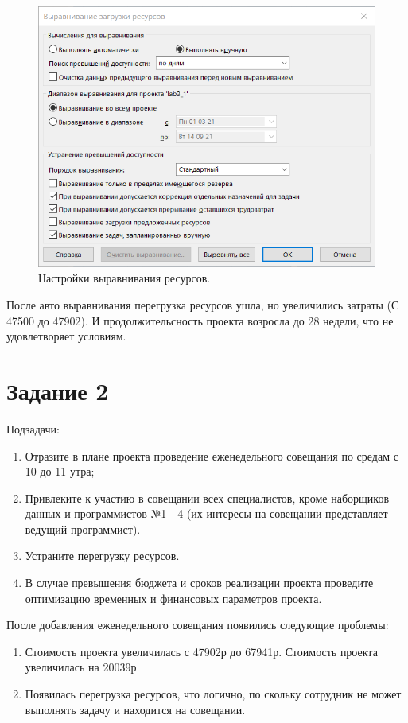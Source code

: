 \begin{figure}[H]
	\centering
	\includegraphics[width=0.7\linewidth]{../../lab_03/report/src/lab3_1_1}
	\caption{Настройки выравнивания ресурсов.}
	\label{fig:lab311}
\end{figure}

После авто выравнивания перегрузка ресурсов ушла, но увеличились затраты (С 47500 до 47902).
И продолжительсность проекта возросла до 28 недели, что не удовлетворяет условиям.

\section{Задание 2}
Подзадачи:
\begin{enumerate}
	\item Отразите в плане проекта проведение еженедельного совещания по
	средам с 10 до 11 утра;
	\item Привлеките к участию в совещании всех специалистов, кроме
	наборщиков данных и программистов №1 - 4 (их интересы на совещании
	представляет ведущий программист).
	\item Устраните перегрузку ресурсов.
	\item В случае превышения бюджета и сроков реализации проекта проведите
	оптимизацию временных и финансовых параметров проекта.
\end{enumerate}

После добавления еженедельного совещания появились следующие проблемы:
\begin{enumerate}
	\item Стоимость проекта увеличилась с 47902р до 67941р. Стоимость проекта увеличилась на 20039р
	\item Появилась перегрузка ресурсов, что логично, по скольку сотрудник не может выполнять задачу и находится на совещании.
\end{enumerate}

